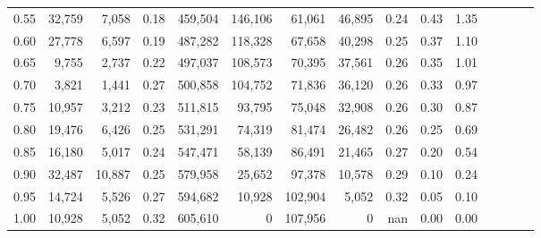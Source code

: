 \begin{tabular}{rrrcrrrrrrrrrrr}
0.55 &  32,759 &   7,058 &                                       0.18 &  459,504 &  146,106 &   61,061 &   46,895 &  0.24 &  0.43 &                         1.35 \\
0.60 &  27,778 &   6,597 &                                       0.19 &  487,282 &  118,328 &   67,658 &   40,298 &  0.25 &  0.37 &                         1.10 \\
0.65 &   9,755 &   2,737 &                                       0.22 &  497,037 &  108,573 &   70,395 &   37,561 &  0.26 &  0.35 &                         1.01 \\
0.70 &   3,821 &   1,441 &                                       0.27 &  500,858 &  104,752 &   71,836 &   36,120 &  0.26 &  0.33 &                         0.97 \\
0.75 &  10,957 &   3,212 &                                       0.23 &  511,815 &   93,795 &   75,048 &   32,908 &  0.26 &  0.30 &                         0.87 \\
0.80 &  19,476 &   6,426 &                                       0.25 &  531,291 &   74,319 &   81,474 &   26,482 &  0.26 &  0.25 &                         0.69 \\
0.85 &  16,180 &   5,017 &                                       0.24 &  547,471 &   58,139 &   86,491 &   21,465 &  0.27 &  0.20 &                         0.54 \\
0.90 &  32,487 &  10,887 &                                       0.25 &  579,958 &   25,652 &   97,378 &   10,578 &  0.29 &  0.10 &                         0.24 \\
0.95 &  14,724 &   5,526 &                                       0.27 &  594,682 &   10,928 &  102,904 &    5,052 &  0.32 &  0.05 &                         0.10 \\
1.00 &  10,928 &   5,052 &                                       0.32 &  605,610 &        0 &  107,956 &        0 &   nan &  0.00 &                         0.00 \\
\bottomrule
\end{tabular}
